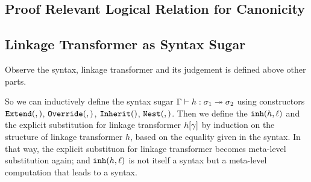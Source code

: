 % 


\subsection{Proof Relevant Logical Relation for Canonicity}


\subsection{Linkage Transformer as Syntax Sugar}
Observe the syntax, linkage transformer and its judgement is defined above 
other parts. 

So we can inductively define the syntax sugar $ {\Gamma} \vdash {h} : {\sigma_1} \twoheadrightarrow {\ensuremath{\sigma}_2}$ using constructors $\texttt{Extend}({},{})$, $\texttt{Override}({},{})$, $\texttt{Inherit}({})$, $\texttt{Nest}({},{})$. Then we define the $\texttt{inh}({h},{\ell})$ and the explicit substitution for linkage transformer ${h}\!\left[{\gamma}\right]$ by induction on the structure of linkage transformer $h$, based on the equality given in the syntax. In that way, the explicit substituon for linkage transformer becomes meta-level substitution again; and $\texttt{inh}({h},{\ell})$ is not itself a syntax but a meta-level computation that leads to a syntax.
